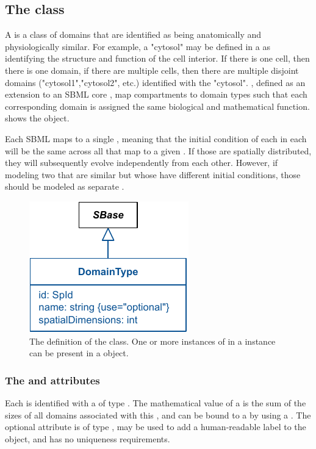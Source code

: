 \subsection{The  class}
\label{domaintype-class}
A \DomainType is a class of domains that are identified as being anatomically and physiologically similar.  For example, a \DomainType "cytosol" may be defined in a \Geometry as identifying the structure and function of the cell interior.  If there is one cell, then there is one domain, if there are multiple cells, then there are multiple disjoint domains ("cytosol1","cytosol2", etc.) identified with the \DomainType "cytosol".  \CompartmentMappings, defined as an extension to an SBML core \Compartment, map compartments to domain types such that each corresponding domain is assigned the same biological and mathematical function.  shows the \DomainType object.

Each SBML \Compartment maps to a single \DomainType, meaning that the initial condition of each \Species in each \Compartment will be the same across all \Domains that map to a given \DomainType.  If those \Species are spatially distributed, they will subsequently evolve independently from each other.  However, if modeling two \Domains that are similar but whose \Species have different initial conditions, those \Domains should be modeled as separate \DomainTypes.

\begin{figure}[ht]
  \includegraphics{figs/DomainType-uml}
  \caption{The definition of the \DomainType class. One or more instances of \DomainType in a \ListOfDomainTypes instance can be present in a \Geometry object.}
  \label{DomainType-uml}
\end{figure}

\subsubsection{The \fixttspace{} and \fixttspace{} attributes}
Each \DomainType is identified with a  of type .  The mathematical value of a \CompartmentMapping is the sum of the sizes of all domains associated with this \DomainType, and can be bound to a \Parameter by using a \SpatialSymbolReference.  The optional  attribute is of type , may be used to add a human-readable label to the object, and has no uniqueness requirements.


